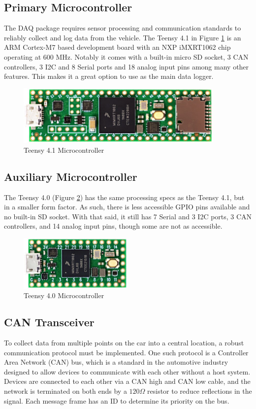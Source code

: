 \subsection{Primary Microcontroller}
The DAQ package requires sensor processing and communication standards to reliably collect and log data from the vehicle.
The Teensy 4.1 in Figure \ref{fig:t41} is an ARM Cortex-M7 based development board with an NXP iMXRT1062 chip operating at 600 MHz.
Notably it comes with a built-in micro SD socket, 3 CAN controllers, 3 I2C and 8 Serial ports and 18 analog input pins among many other features.
This makes it a great option to use as the main data logger.
\begin{figure}[H]
        \centering
        \includegraphics[width=4in]{images/teensy41.jpg}
        \caption{Teensy 4.1 Microcontroller}
        \label{fig:t41}
\end{figure}

\subsection{Auxiliary Microcontroller}
The Teensy 4.0 (Figure \ref{fig:t40}) has the same processing specs as the Teensy 4.1, but in a smaller form factor.
As such, there is less accessible GPIO pins available and no built-in SD socket.
With that said, it still has 7 Serial and 3 I2C ports, 3 CAN controllers, and 14 analog input pins, though some are not as accessible.
\vspace{1em}

\begin{figure}[H]
\centering
\includegraphics[width=2.2in]{images/teensy40.jpg}
\caption{Teensy 4.0 Microcontroller}
\label{fig:t40}
\end{figure}
\subsection{CAN Transceiver}
To collect data from multiple points on the car into a central location, a robust communication protocol must be implemented.
One such protocol is a Controller Area Network (CAN) bus, which is a standard in the automotive industry designed to allow devices to communicate with each other without a host system.
Devices are connected to each other via a CAN high and CAN low cable, and the network is terminated on both ends by a $120\Omega$ resistor to reduce reflections in the signal.
Each message frame has an ID to determine its priority on the bus.

